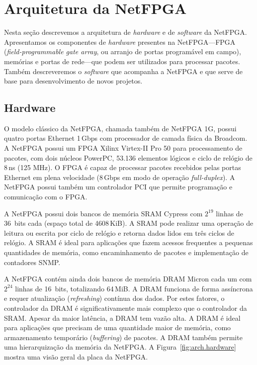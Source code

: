 \newpage
\section{Arquitetura da NetFPGA}
\label{sec:arch}

Nesta seção descrevemos a arquitetura de \emph{hardware} e de
\emph{software} da NetFPGA.  Apresentamos os componentes de
\emph{hardware} presentes na NetFPGA---FPGA
(\emph{field-programmable gate array}, ou arranjo de portas
programável em campo), memórias e portas de rede---que podem ser
utilizados para processar pacotes.  Também descreveremos o
\emph{software} que acompanha a NetFPGA e que serve de base para
desenvolvimento de novos projetos.

\subsection{Hardware}
\label{sec:arch.hw}

O modelo clássico da NetFPGA, chamada também de NetFPGA 1G, possui
quatro portas Ethernet 1\,Gbps com processador de camada física da
Broadcom.  A NetFPGA possui um FPGA Xilinx Virtex-II Pro 50 para
processamento de pacotes, com dois núcleos PowerPC, 53.136 elementos
lógicos e ciclo de relógio de 8\,ns (125 MHz).  O FPGA é capaz de
processar pacotes recebidos pelas portas Ethernet em plena
velocidade (8\,Gbps em modo de operação \emph{full-duplex}).  A
NetFPGA possui também um controlador PCI que permite programação e
comunicação com o FPGA.

A NetFPGA possui dois bancos de memória SRAM Cypress com $2^{19}$
linhas de 36~bits cada (espaço total de 4608\,KiB).  A SRAM pode
realizar uma operação de leitura ou escrita por ciclo de relógio e
retorna dados lidos em três ciclos de relógio.  A SRAM é ideal para
aplicações que fazem acessos frequentes a pequenas quantidades de
memória, como encaminhamento de pacotes e implementação de
contadores SNMP.

A NetFPGA contém ainda dois bancos de memória DRAM Micron cada um
com $2^{24}$ linhas de 16~bits, totalizando 64\,MiB.  A DRAM
funciona de forma assíncrona e requer atualização
(\emph{refreshing}) contínua dos dados.  Por estes fatores, o
controlador da DRAM é significativamente mais complexo que o
controlador da SRAM.  Apesar da maior latência, a DRAM tem vazão
alta.  A DRAM é ideal para aplicações que precisam de uma quantidade
maior de memória, como armazenamento temporário (\emph{buffering})
de pacotes.  A DRAM também permite uma hierarquização da memória da
NetFPGA.  A Figura~\ref{fig:arch.hardware} mostra uma visão geral da
placa da NetFPGA.

